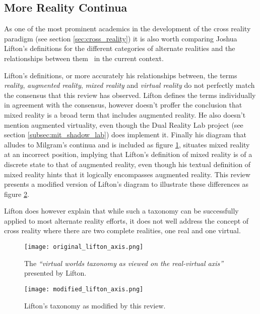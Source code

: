 \subsection{More Reality Continua}
As one of the most prominent academics in the development of the cross reality paradigm (see section \ref{sec:cross_reality}) it is also worth comparing Joshua Lifton's definitions for the different categories of alternate realities and the relationships between them~\cite{Lifton2007a} in the current context.

Lifton's definitions, or more accurately his relationships between, the terms \textit{reality}, \textit{augmented reality}, \textit{mixed reality} and \textit{virtual reality} do not perfectly match the consensus that this review has observed. Lifton defines the terms individually in agreement with the consensus, however doesn't proffer the conclusion that mixed reality is a broad term that includes augmented reality. He also doesn't mention augmented virtuality, even though the Dual Reality Lab project (see section \ref{subsec:mit_shadow_lab}) does implement it. Finally his diagram that alludes to Milgram's continua and is included as figure \ref{original_lifton_axis.png}, situates mixed reality at an incorrect position, implying that Lifton's definition of mixed reality is of a discrete state to that of augmented reality, even though his textual definition of mixed reality hints that it logically encompasses augmented reality. This review presents a modified version of Lifton's diagram to illustrate these differences as figure \ref{modified_lifton_axis.png}.

Lifton does however explain that while such a taxonomy can be successfully applied to most alternate reality efforts, it does not well address the concept of cross reality where there are two complete realities, one real and one virtual.

\begin{figure}[h]
\centering
\texttt{[image: original\_lifton\_axis.png]}
\caption{The \textit{``virtual worlds taxonomy as viewed on the real-virtual axis''} presented by Lifton.}
\label{original_lifton_axis.png}
\end{figure}

\begin{figure}[h]
\centering
\texttt{[image: modified\_lifton\_axis.png]}
\caption{Lifton's taxonomy as modified by this review.}
\label{modified_lifton_axis.png}
\end{figure}

